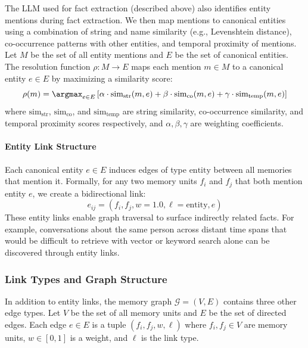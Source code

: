 The LLM used for fact extraction (described above) also identifies entity mentions during fact extraction. We then map mentions to canonical entities using a combination of string and name similarity (e.g., Levenshtein distance), co-occurrence patterns with other entities, and temporal proximity of mentions. Let $M$ be the set of all entity mentions and $E$ be the set of canonical entities. The resolution function $\rho: M \rightarrow E$ maps each mention $m \in M$ to a canonical entity $e \in E$ by maximizing a similarity score:
\begin{equation}
\rho(m) = \argmax_{e \in E} \left[ \alpha \cdot \text{sim}_{\text{str}}(m, e) + \beta \cdot \text{sim}_{\text{co}}(m, e) + \gamma \cdot \text{sim}_{\text{temp}}(m, e) \right]
\end{equation}
where $\text{sim}_{\text{str}}$, $\text{sim}_{\text{co}}$, and $\text{sim}_{\text{temp}}$ are string similarity, co-occurrence similarity, and temporal proximity scores respectively, and $\alpha, \beta, \gamma$ are weighting coefficients.

\paragraph{Entity Link Structure}

Each canonical entity $e \in E$ induces edges of type $\text{entity}$ between all memories that mention it. Formally, for any two memory units $f_i$ and $f_j$ that both mention entity $e$, we create a bidirectional link:
\begin{equation}
e_{ij} = (f_i, f_j, w=1.0, \ell=\text{entity}, e)
\end{equation}
These entity links enable graph traversal to surface indirectly related facts. For example, conversations about the same person across distant time spans that would be difficult to retrieve with vector or keyword search alone can be discovered through entity links.

\subsubsection{Link Types and Graph Structure}

In addition to entity links, the memory graph $\mathcal{G} = (V, E)$ contains three other edge types. Let $V$ be the set of all memory units and $E$ be the set of directed edges. Each edge $e \in E$ is a tuple $(f_i, f_j, w, \ell)$ where $f_i, f_j \in V$ are memory units, $w \in [0,1]$ is a weight, and $\ell$ is the link type.

